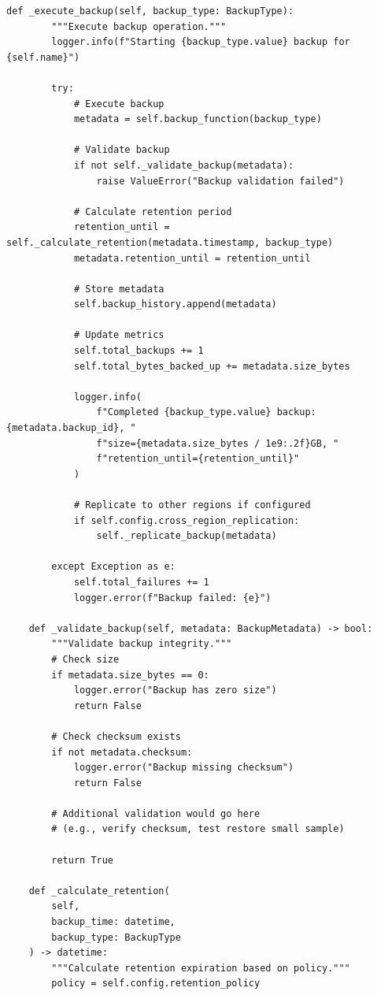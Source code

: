 \begin{lstlisting}[style=python, caption={Backup Scheduler with Retention Policies}]
    def _execute_backup(self, backup_type: BackupType):
        """Execute backup operation."""
        logger.info(f"Starting {backup_type.value} backup for {self.name}")

        try:
            # Execute backup
            metadata = self.backup_function(backup_type)

            # Validate backup
            if not self._validate_backup(metadata):
                raise ValueError("Backup validation failed")

            # Calculate retention period
            retention_until = self._calculate_retention(metadata.timestamp, backup_type)
            metadata.retention_until = retention_until

            # Store metadata
            self.backup_history.append(metadata)

            # Update metrics
            self.total_backups += 1
            self.total_bytes_backed_up += metadata.size_bytes

            logger.info(
                f"Completed {backup_type.value} backup: {metadata.backup_id}, "
                f"size={metadata.size_bytes / 1e9:.2f}GB, "
                f"retention_until={retention_until}"
            )

            # Replicate to other regions if configured
            if self.config.cross_region_replication:
                self._replicate_backup(metadata)

        except Exception as e:
            self.total_failures += 1
            logger.error(f"Backup failed: {e}")

    def _validate_backup(self, metadata: BackupMetadata) -> bool:
        """Validate backup integrity."""
        # Check size
        if metadata.size_bytes == 0:
            logger.error("Backup has zero size")
            return False

        # Check checksum exists
        if not metadata.checksum:
            logger.error("Backup missing checksum")
            return False

        # Additional validation would go here
        # (e.g., verify checksum, test restore small sample)

        return True

    def _calculate_retention(
        self,
        backup_time: datetime,
        backup_type: BackupType
    ) -> datetime:
        """Calculate retention expiration based on policy."""
        policy = self.config.retention_policy


\end{lstlisting}
